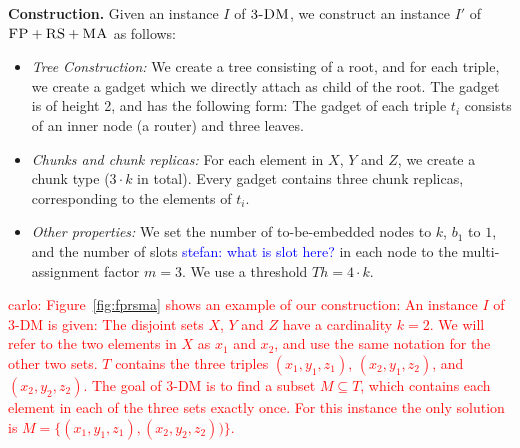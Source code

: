 \documentclass[9pt]{sigcomm-alternate}
\newcommand{\carlo}[1]{\textcolor{red}{carlo: #1}}
\newcommand{\maciek}[1]{\textcolor{brown}{maciek: #1}}
\newcommand{\stefan}[1]{\textcolor{blue}{stefan: #1}}
\newcommand{\MaFactor}{m}
\newcommand{\FP}{\textsc{FP}}
\newcommand{\RS}{\textsc{RS}}
\newcommand{\MA}{\textsc{MA}}
\newcommand{\CostTrans}{\ensuremath{b_1}}
\newcommand{\TDM}{\textsc{3-DM}}
\newcommand{\Thr}{\ensuremath{Th}}
\begin{document}
\textbf{Construction.}
Given an instance $I$ of $\TDM$, we construct an instance $I'$ of
$\FP+\RS+\MA$ as follows:
\begin{itemize}
\item \emph{Tree Construction:} We create a tree consisting of a root,
and for each triple, we create a gadget which we directly attach as
child of the root. The gadget is of height 2,
and has the following form:
The gadget of each triple $t_i$ consists of an inner node (a router) and three leaves.
\item \emph{Chunks and chunk replicas:} For each element in $X$, $Y$ and $Z$,
 we create a chunk type
($3 \cdot k$ in total). Every gadget
contains three chunk replicas, corresponding to the elements of $t_i$.
\item \emph{Other properties:} We set the number of to-be-embedded nodes to $k$,
$\CostTrans$ to $1$, and the number of slots \stefan{what is slot here?} in each node to the multi-assignment factor
$\MaFactor=3$.
We use a threshold $\Thr= 4
\cdot k$.
\end{itemize}

\carlo{Figure~\ref{fig:fprsma} shows an example of our construction: An 
instance $I$ of 3-DM is given: The disjoint sets $X$, $Y$ and $Z$ have a 
cardinality $k=2$. We will refer to the two elements in $X$ as $x_1$ and $x_2$, 
and use the same notation for the other two sets. $T$ contains the three triples 
$(x_1, y_1, 
z_1)$, $(x_2, y_1, z_2)$, and $(x_2, y_2, z_2)$. The goal of 3-DM is to find a 
subset $M \subseteq T$, which contains each element in each of the three sets 
exactly once. For this instance the only solution is $M = 
\{(x_1,y_1,z_1),(x_2,y_2,z_2))\}$.}
\end{document}
